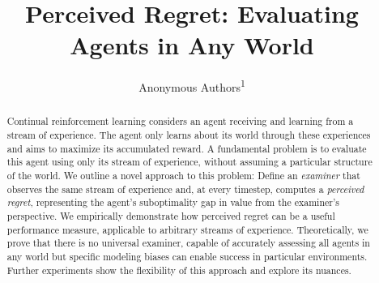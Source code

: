 \documentclass[10pt]{article} %
\title{Perceived Regret: Evaluating Agents in Any World}
\author{Anonymous Authors\textsuperscript{1}}
\theoremstyle{definition}
\theoremstyle{plain}
\begin{document}
\makeCover
\maketitle

\begin{abstract}
Continual reinforcement learning considers an agent receiving and learning from a stream of experience. The agent only learns about its world through these experiences and aims to maximize its accumulated reward. A fundamental problem is to evaluate this agent using only its stream of experience, without assuming a particular structure of the world.
We outline a novel approach to this problem: Define an \textit{examiner} that observes the same stream of experience and, at every timestep, computes a \textit{perceived regret}, representing the agent's suboptimality gap in value from the examiner's perspective.
We empirically demonstrate how perceived regret can be a useful performance measure, applicable to arbitrary streams of experience.
Theoretically, we prove that there is no universal examiner, capable of accurately assessing all agents in any world but specific modeling biases can enable success in particular environments.
Further experiments show the flexibility of this approach and explore its nuances. 

\end{abstract}














\newpage




\newpage

\appendix


\end{document}

